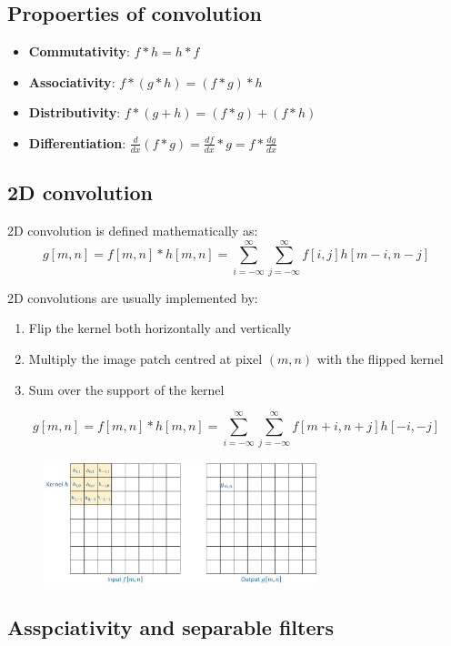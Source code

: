 \documentclass{report}
\begin{document}
\subsection{Propoerties of convolution}
\begin{itemize}
    \item \textbf{Commutativity}: $f * h = h * f$
    \item \textbf{Associativity}: $f * (g * h) = (f * g) * h$
    \item \textbf{Distributivity}: $f * (g + h) = (f * g) + (f * h)$
    \item \textbf{Differentiation}: $\frac{d}{dx} (f * g) = \frac{df}{dx}*g = f*\frac{dg}{dx}$
\end{itemize}

\subsection{2D convolution}

2D convolution is defined mathematically as:
$$
    g[m,n] = f[m,n] * h[m,n] = \sum_{i=-\infty}^\infty \sum_{j=-\infty}^\infty f[i,j]h[m-i, n-j]
$$

2D convolutions are usually implemented by: 
\begin{enumerate}
    \item Flip the kernel both horizontally and vertically 
    \item Multiply the image patch centred at pixel $(m,n)$ with the flipped kernel
    \item Sum over the support of the kernel
\end{enumerate}
$$
    g[m,n] = f[m,n] * h[m,n] = \sum_{i=-\infty}^\infty \sum_{j=-\infty}^\infty f[m+i, n+j]h[-i,-j]
$$
\begin{figure}[h]
    \centering
    \includegraphics[width=8cm]{2D convolution.JPG}
\end{figure}

\subsection{Asspciativity and separable filters}
\end{document}
